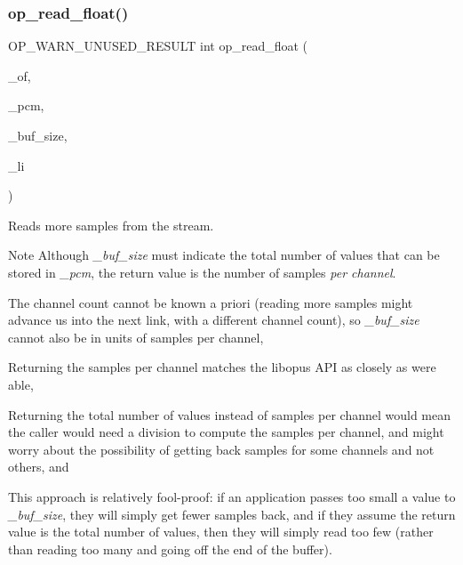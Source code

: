 \subsubsection{\texorpdfstring{op\_read\_float()}{op\_read\_float()}}
{\footnotesize\ttfamily O\+P\+\_\+\+W\+A\+R\+N\+\_\+\+U\+N\+U\+S\+E\+D\+\_\+\+R\+E\+S\+U\+LT int op\+\_\+read\+\_\+float (\begin{DoxyParamCaption}\item[{Ogg\+Opus\+File $\ast$}]{\+\_\+of,  }\item[{float $\ast$}]{\+\_\+pcm,  }\item[{int}]{\+\_\+buf\+\_\+size,  }\item[{int $\ast$}]{\+\_\+li }\end{DoxyParamCaption})}

Reads more samples from the stream. \begin{DoxyNote}{Note}
Although {\itshape \+\_\+buf\+\_\+size} must indicate the total number of values that can be stored in {\itshape \+\_\+pcm}, the return value is the number of samples {\itshape per channel}. 
\begin{DoxyEnumerate}
\item The channel count cannot be known a priori (reading more samples might advance us into the next link, with a different channel count), so {\itshape \+\_\+buf\+\_\+size} cannot also be in units of samples per channel, 
\item Returning the samples per channel matches the {\ttfamily libopus} A\+PI as closely as we\textquotesingle{}re able, 
\item Returning the total number of values instead of samples per channel would mean the caller would need a division to compute the samples per channel, and might worry about the possibility of getting back samples for some channels and not others, and 
\item This approach is relatively fool-\/proof\+: if an application passes too small a value to {\itshape \+\_\+buf\+\_\+size}, they will simply get fewer samples back, and if they assume the return value is the total number of values, then they will simply read too few (rather than reading too many and going off the end of the buffer). 
\end{DoxyEnumerate}
\end{DoxyNote}

